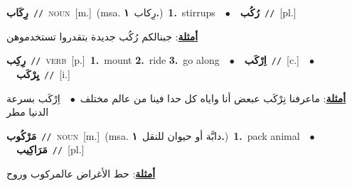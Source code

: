 \documentclass[10pt,a4paper,twoside]{article} %
\begin{document}
\begin{multicols}{2}
{\setlength\topsep{0pt}\textbf{\foreignlanguage{arabic}{رِكَاب}}\ {\color{gray}\texttt{//}\color{black}}\ \textsc{noun}\ [m.]\ \color{gray}(msa. \foreignlanguage{arabic}{رِكاب}~\foreignlanguage{arabic}{\textbf{١.}})\color{black}\ \textbf{1.}~stirrups\ \ $\bullet$\ \ \setlength\topsep{0pt}\textbf{\foreignlanguage{arabic}{رُكُب}}\ {\color{gray}\texttt{//}\color{black}}\ [pl.]\  \begin{flushright}\color{gray}\foreignlanguage{arabic}{\textbf{\underline{\foreignlanguage{arabic}{أمثلة}}}: جبنالكم رُكُب جديدة بتقدروا تستخدموهن}\end{flushright}\color{black}} \vspace{2mm}

{\setlength\topsep{0pt}\textbf{\foreignlanguage{arabic}{رِكِب}}\ {\color{gray}\texttt{//}\color{black}}\ \textsc{verb}\ [p.]\ \textbf{1.}~mount  \textbf{2.}~ride  \textbf{3.}~go along\ \ $\bullet$\ \ \setlength\topsep{0pt}\textbf{\foreignlanguage{arabic}{اِرْكَب}}\ {\color{gray}\texttt{//}\color{black}}\ [c.]\ \ $\bullet$\ \ \setlength\topsep{0pt}\textbf{\foreignlanguage{arabic}{يِرْكَب}}\ {\color{gray}\texttt{//}\color{black}}\ [i.]\  \begin{flushright}\color{gray}\foreignlanguage{arabic}{\textbf{\underline{\foreignlanguage{arabic}{أمثلة}}}: ماعرفنا نِرْكَب عبعض أنا واياه كل حدا فينا من عالم مختلف\ $\bullet$\ \  اِرْكَب بسرعة الدنيا مطر}\end{flushright}\color{black}} \vspace{2mm}

{\setlength\topsep{0pt}\textbf{\foreignlanguage{arabic}{مَرْكُوب}}\ {\color{gray}\texttt{//}\color{black}}\ \textsc{noun}\ [m.]\ \color{gray}(msa. \foreignlanguage{arabic}{دابَّة أو حيوان للنقل}~\foreignlanguage{arabic}{\textbf{١.}})\color{black}\ \textbf{1.}~pack animal\ \ $\bullet$\ \ \setlength\topsep{0pt}\textbf{\foreignlanguage{arabic}{مَرَاكِيب}}\ {\color{gray}\texttt{//}\color{black}}\ [pl.]\  \begin{flushright}\color{gray}\foreignlanguage{arabic}{\textbf{\underline{\foreignlanguage{arabic}{أمثلة}}}: حط الأغراض عالمركوب وروح}\end{flushright}\color{black}} \vspace{2mm}


\end{multicols}
\end{document}
